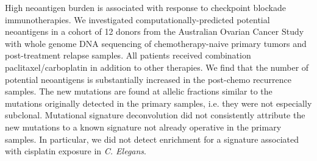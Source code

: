 High neoantigen burden is associated with response to checkpoint blockade immunotherapies. We investigated computationally-predicted potential neoantigens in a cohort of 12 donors from the Australian Ovarian Cancer Study with whole genome DNA sequencing of chemotherapy-naive primary tumors and post-treatment relapse samples. All patients received combination paclitaxel/carboplatin in addition to other therapies. We find that the number of potential neoantigens is substantially increased in the post-chemo recurrence samples. The new mutations are found at allelic fractions similar to the mutations originally detected in the primary samples, i.e. they were not especially subclonal. Mutational signature deconvolution did not consistently attribute the new mutations to a known signature not already operative in the primary samples. In particular, we did not detect enrichment for a signature associated with cisplatin exposure in \textit{C. Elegans}.

